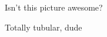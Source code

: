 \lipsum[81-100]

\begin{figure}
  \centering
  
  \caption[Awesome picture]{Isn't this picture awesome?}
\end{figure}

\begin{figure}
  \centering
  
  \caption[Tubular picture]{Totally tubular, dude}
\end{figure}
